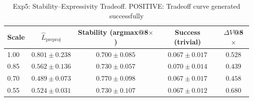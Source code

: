 \begin{table}[t]
\centering
\caption{Exp5: Stability–Expressivity Tradeoff. POSITIVE: Tradeoff curve generated successfully}
\label{tab:exp5-tradeoff}
\begin{tabular}{lcccc}
\toprule
Scale & $\hat{L}_{\text{preproj}}$ & Stability (argmax@8$\times$) & Success (trivial) & $\Delta V$@8$\times$ \\
\midrule
1.00 & $0.801 \pm 0.238$ & $0.700 \pm 0.085$ & $0.067 \pm 0.017$ & $0.528$ \\
0.85 & $0.562 \pm 0.136$ & $0.730 \pm 0.057$ & $0.070 \pm 0.014$ & $0.439$ \\
0.70 & $0.489 \pm 0.073$ & $0.770 \pm 0.098$ & $0.067 \pm 0.017$ & $0.458$ \\
0.55 & $0.524 \pm 0.031$ & $0.730 \pm 0.107$ & $0.067 \pm 0.012$ & $0.680$ \\
\bottomrule
\end{tabular}
\end{table}
